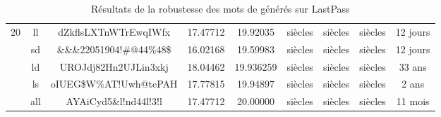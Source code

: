 \begin{table}[H]
{\begin{tabular}{lcccccccc}
			\multirow{5}{*}{20}                               & ll                           & dZkflsLXTnWTrEwqIWfx                             & 17.47712                                                                            & 19.92035                                                                                        & siècles                                                            & siècles                                                              & siècles                                                              & 12 jours                                                             \\ \cline{2-9} 
			& sd                           & \&\&\&22051904!\#@44\%48\$                       & 16.02168                                                                            & 19.59983                                                                                        & siècles                                                            & siècles                                                              & siècles                                                              & 12 jours                                                             \\ \cline{2-9} 
			& ld                           & UROJdj82Hn2UJLin3xkj                             & 18.04462                                                                            & 19.936259                                                                                       & siècles                                                            & siècles                                                              & siècles                                                              & 33 ans                                                               \\ \cline{2-9} 
			& ls                           & oIUEG\$W\%AT!Uwh@tePAH                           & 17.77815                                                                            & 19.94897                                                                                        & siècles                                                            & siècles                                                              & siècles                                                              & 2 ans                                                                \\ \cline{2-9} 
			& all                          & AYAiCyd5\&l!nd44l!3!l                            & 17.47712                                                                            & 20.00000                                                                                        & siècles                                                            & siècles                                                              & siècles                                                              & 11 mois                                                              \\ \hline\toprule
		\end{tabular}%
	}
\caption{Résultats de la robustesse des mots de générés sur LastPass}
\label{lp_result}
\end{table}

